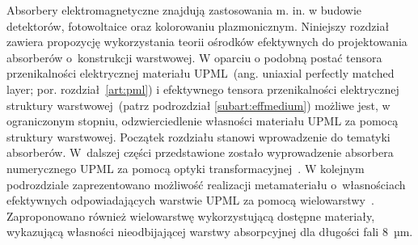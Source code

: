 Absorbery elektromagnetyczne znajdują zastosowania m. in. w budowie detektorów, fotowoltaice oraz kolorowaniu plazmonicznym. Niniejszy rozdział zawiera propozycję wykorzystania teorii ośrodków efektywnych do projektowania absorberów o~konstrukcji warstwowej. W oparciu o podobną postać tensora przenikalności elektrycznej materiału UPML~(ang. uniaxial perfectly matched layer; por. rozdział~\ref{art:pml}) i efektywnego tensora przenikalności elektrycznej struktury warstwowej~(patrz podrozdział \ref{subart:effmedium}) możliwe jest, w ograniczonym stopniu, odzwierciedlenie własności materiału UPML za pomocą struktury warstwowej. Początek rozdziału stanowi wprowadzenie do tematyki absorberów. W~dalszej części przedstawione zostało wyprowadzenie absorbera numerycznego UPML za pomocą optyki transformacyjnej~\cite{pendry2012transformation}. W kolejnym podrozdziale zaprezentowano możliwość realizacji metamateriału o~własnościach efektywnych odpowiadających warstwie UPML za pomocą wielowarstwy~\cite{ania2015}. Zaproponowano również wielowarstwę wykorzystującą dostępne materiały, wykazującą własności nieodbijającej warstwy absorpcyjnej dla długości fali $8$~µm.


